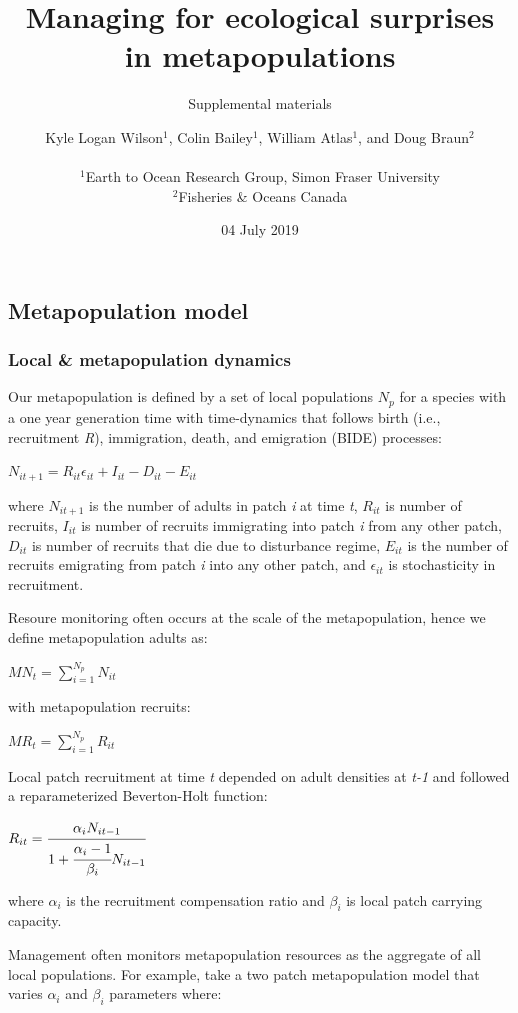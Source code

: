 \documentclass[]{article}
\title{Managing for ecological surprises in metapopulations}
\subtitle{Supplemental materials}
\author{Kyle Logan Wilson\(^1\), Colin Bailey\(^1\), William Atlas\(^1\), and
Doug Braun\(^2\)\\
~\\
\(^1\)Earth to Ocean Research Group, Simon Fraser University\\
\(^2\)Fisheries \& Oceans Canada}
\date{04 July 2019}
\begin{document}
\maketitle

\hypertarget{metapopulation-model}{%
\subsection{Metapopulation model}\label{metapopulation-model}}

\hypertarget{local-metapopulation-dynamics}{%
\subsubsection{Local \& metapopulation
dynamics}\label{local-metapopulation-dynamics}}

Our metapopulation is defined by a set of local populations \(N_p\) for
a species with a one year generation time with time-dynamics that
follows birth (i.e., recruitment \emph{R}), immigration, death, and
emigration (BIDE) processes:

\(N_{i{t+1}}= R_{it}\epsilon_{it}+I_{it}-D_{it}-E_{it}\)

where \(N_{it+1}\) is the number of adults in patch \emph{i} at time
\emph{t}, \(R_{it}\) is number of recruits, \(I_{it}\) is number of
recruits immigrating into patch \emph{i} from any other patch,
\(D_{it}\) is number of recruits that die due to disturbance regime,
\(E_{it}\) is the number of recruits emigrating from patch \emph{i} into
any other patch, and \(\epsilon_{it}\) is stochasticity in recruitment.

Resoure monitoring often occurs at the scale of the metapopulation,
hence we define metapopulation adults as:

\({MN}_t = \sum_{i=1}^{N_p} N_{it}\)

with metapopulation recruits:

\(MR_t = \sum_{i=1}^{N_p} R_{it}\)

Local patch recruitment at time \emph{t} depended on adult densities at
\emph{t-1} and followed a reparameterized Beverton-Holt function:

\(R_{it}=\cfrac{\alpha_iN_{it-1}}{1+\cfrac{\alpha_i-1}{\beta_i}N_{it-1}}\)

where \(\alpha_i\) is the recruitment compensation ratio and \(\beta_i\)
is local patch carrying capacity.

Management often monitors metapopulation resources as the aggregate of
all local populations. For example, take a two patch metapopulation
model that varies \(\alpha_i\) and \(\beta_i\) parameters where:
\end{document}
